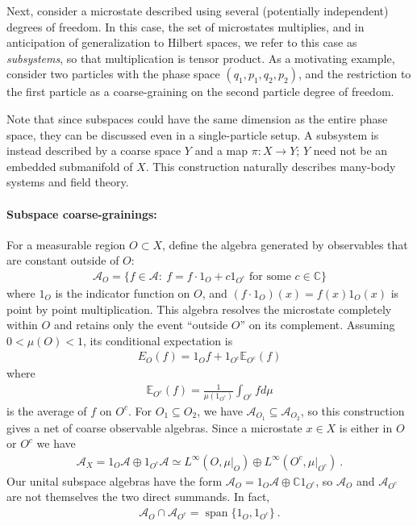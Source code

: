 \documentclass[a4paper,11pt]{article}
\theoremstyle{definition}
\newcommand{\mA}{\mathcal{A}}
\begin{document}
Next, consider a microstate described using several (potentially independent) degrees of freedom. In this case, the set of microstates multiplies, and in anticipation of generalization to Hilbert spaces, we refer to this case as {\it subsystems}, so that multiplication is tensor product. As a motivating example, consider two particles with the phase space $(q_1,p_1,q_2,p_2)$, and the restriction to the first particle as a coarse-graining on the second particle degree of freedom. 

Note that since subspaces could have the same dimension as the entire phase space, they can be discussed even in a single-particle setup. A subsystem is instead described by a coarse space $Y$ and a map $\pi:X\to Y$; $Y$ need not be an embedded submanifold of $X$. This construction naturally describes many-body systems and field theory. 



\paragraph{Subspace coarse-grainings:}
For a measurable region $O\subset X$, define the algebra generated by observables that are constant outside of $O$:
\begin{align}
    \mA_O=\{f\in\mA:\ f=f \cdot 1_O +c 1_{O^c}\text{ for some }c\in\mathbb C\}
\end{align}
where $1_O$ is the indicator function on $O$, and $(f\cdot 1_O)(x)=f(x)1_O(x)$ is point by point multiplication.
This algebra resolves the microstate completely within $O$ and retains only the event ``outside $O$'' on its complement. Assuming $0<\mu(O)<1$, its conditional expectation is
\begin{align}
    E_O(f)=1_O f+
    1_{O^c}\mathbb{E}_{O^c}(f)
\end{align}
where 
\begin{align}
    \mathbb{E}_{O^c}(f)=\frac{1}{\mu(1_{O^c})}\int_{O^c} f d\mu
\end{align}
is the average of $f$ on $O^c$.
For $O_1\subseteq O_2$, we have $\mA_{O_1}\subseteq\mA_{O_2}$, so this construction gives a net of coarse observable algebras. Since a microstate $x\in X$ is either in $O$ or $O^c$ we have 
\begin{align}
    \mA_X=1_O\mA\oplus 1_{O^c}\mA
    \simeq L^\infty(O,\mu|_O)\oplus L^\infty(O^c,\mu|_{O^c})\ .
\end{align}
Our unital subspace algebras have the form $\mA_O=1_O\mA\oplus\mathbb C1_{O^c}$, so $\mA_O$ and $\mA_{O^c}$ are not themselves the two direct summands. In fact,
\begin{align}
    \mA_O\cap\mA_{O^c}=\operatorname{span}\{1_O,1_{O^c}\}\ .
\end{align}
\end{document}
